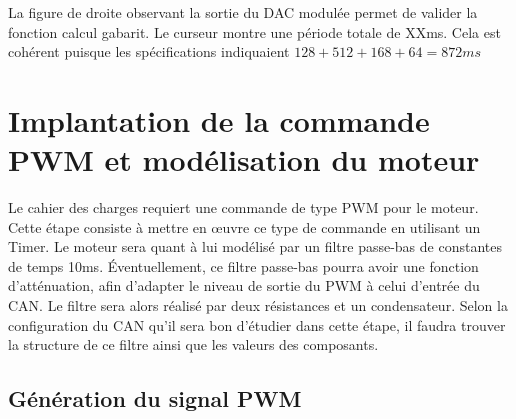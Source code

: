 \documentclass[a4paper]{article}
\begin{document}
La figure de droite observant la sortie du DAC modulée permet de valider la fonction calcul gabarit. Le curseur montre une période totale de XXms. Cela est cohérent puisque les spécifications indiquaient $128 + 512 + 168 + 64 = 872ms$

\newpage
\section{Implantation de la commande PWM et modélisation du moteur}
	Le cahier des charges requiert une commande de type PWM pour le moteur. Cette étape consiste à mettre en œuvre ce type de commande en utilisant un Timer. Le moteur sera quant à lui modélisé par un filtre passe-bas de constantes de temps 10ms. Éventuellement, ce filtre passe-bas pourra avoir une fonction d’atténuation, afin d’adapter le niveau de sortie du PWM à celui d'entrée du CAN. Le filtre sera alors réalisé par deux résistances et un condensateur. Selon la configuration du CAN qu’il sera bon d’étudier dans cette étape, il faudra trouver la structure de ce filtre ainsi que les valeurs des composants. 
	
\subsection{Génération du signal PWM}
\end{document}
